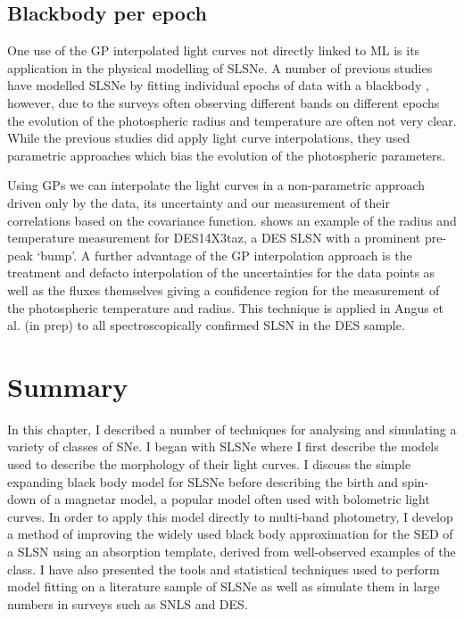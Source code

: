 \subsection{Blackbody per epoch}
One use of the GP interpolated light curves not directly linked to ML is its application in the physical modelling of SLSNe. A number of previous studies have modelled SLSNe by fitting individual epochs of data with a blackbody \citep{Howell2013,Papadopuplus2014,Smith2016,Nicholl2017}, however, due to the surveys often observing different bands on different epochs the evolution of the photospheric radius and temperature are often not very clear. While the previous studies did apply light curve interpolations, they used parametric approaches which bias the evolution of the photospheric parameters.

Using GPs we can interpolate the light curves in a non-parametric approach driven only by the data, its uncertainty and our measurement of their correlations based on the covariance function.  shows an example of the radius and temperature measurement for DES14X3taz, a DES SLSN with a prominent pre-peak `bump'. A further advantage of the GP interpolation approach is the treatment and defacto interpolation of the uncertainties for the data points as well as the fluxes themselves giving a confidence region for the measurement of the photospheric temperature and radius. This technique is applied in Angus et al. (in prep) to all spectroscopically confirmed SLSN in the DES sample.

\begin{figure}
  \caption{}
  \label{fig:GPBB}
\end{figure}

\section{Summary}
In this chapter, I described a number of techniques for analysing and simulating a variety of classes of SNe. I began with SLSNe where I first describe the models used to describe the morphology of their light curves. I discuss the simple expanding black body model for SLSNe before describing the birth and spin-down of a magnetar model, a popular model often used with bolometric light curves. In order to apply this model directly to multi-band photometry, I develop a method of improving the widely used black body approximation for the SED of a SLSN using an absorption template, derived from well-observed examples of the class. I have also presented the tools and statistical techniques used to perform model fitting on a literature sample of SLSNe as well as simulate them in large numbers in surveys such as SNLS and DES.

